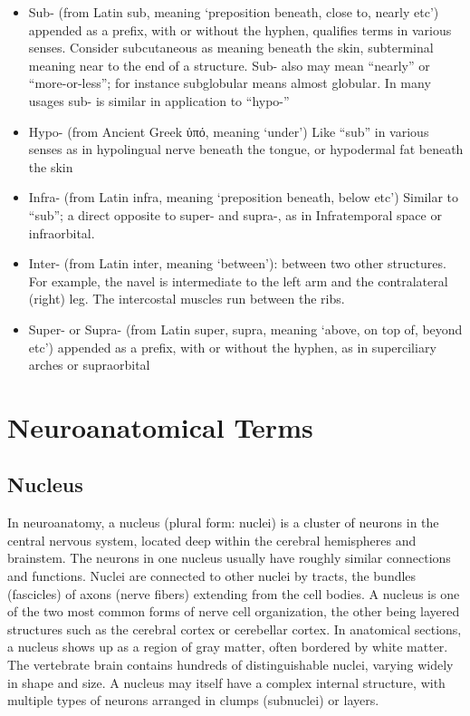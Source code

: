 \documentclass[]{book}
\providecommand{\tightlist}{%
  \setlength{\itemsep}{0pt}\setlength{\parskip}{0pt}}
\begin{document}
\begin{itemize}
\tightlist
\item
  Sub- (from Latin sub, meaning `preposition beneath, close to, nearly etc') appended as a prefix, with or without the hyphen, qualifies terms in various senses. Consider subcutaneous as meaning beneath the skin, subterminal meaning near to the end of a structure. Sub- also may mean ``nearly'' or ``more-or-less''; for instance subglobular means almost globular. In many usages sub- is similar in application to ``hypo-''
\item
  Hypo- (from Ancient Greek ὑπό, meaning `under') Like ``sub'' in various senses as in hypolingual nerve beneath the tongue, or hypodermal fat beneath the skin
\item
  Infra- (from Latin infra, meaning `preposition beneath, below etc') Similar to ``sub''; a direct opposite to super- and supra-, as in Infratemporal space or infraorbital.
\item
  Inter- (from Latin inter, meaning `between'): between two other structures. For example, the navel is intermediate to the left arm and the contralateral (right) leg. The intercostal muscles run between the ribs.
\item
  Super- or Supra- (from Latin super, supra, meaning `above, on top of, beyond etc') appended as a prefix, with or without the hyphen, as in superciliary arches or supraorbital
\end{itemize}

\hypertarget{neuroanatomical-terms}{%
\chapter{Neuroanatomical Terms}\label{neuroanatomical-terms}}

\hypertarget{nucleus}{%
\section{Nucleus}\label{nucleus}}

In neuroanatomy, a nucleus (plural form: nuclei) is a cluster of neurons in the central nervous system, located deep within the cerebral hemispheres and brainstem. The neurons in one nucleus usually have roughly similar connections and functions. Nuclei are connected to other nuclei by tracts, the bundles (fascicles) of axons (nerve fibers) extending from the cell bodies. A nucleus is one of the two most common forms of nerve cell organization, the other being layered structures such as the cerebral cortex or cerebellar cortex. In anatomical sections, a nucleus shows up as a region of gray matter, often bordered by white matter. The vertebrate brain contains hundreds of distinguishable nuclei, varying widely in shape and size. A nucleus may itself have a complex internal structure, with multiple types of neurons arranged in clumps (subnuclei) or layers.
\end{document}
